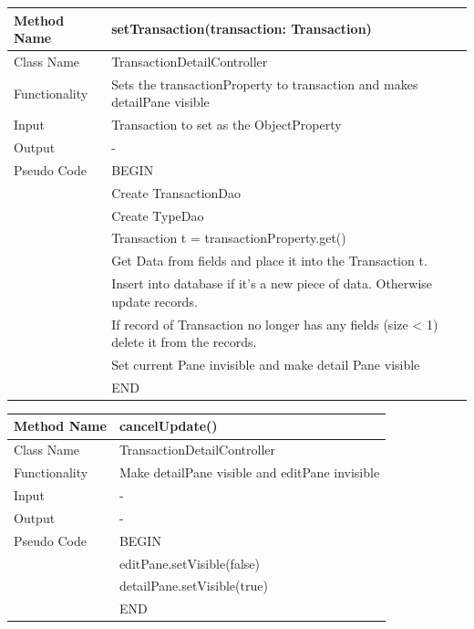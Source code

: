 \documentclass[12pt]{article}
\begin{document}
\begin{tabular}{ |p{3cm}||p{\colWidth}|  }
	\hline
	Method Name &  setTransaction(transaction: Transaction) \\
	\hline
	Class Name & TransactionDetailController\\
	\hline
	Functionality & Sets the transactionProperty to transaction and makes detailPane visible\\
	\hline
	Input & Transaction to set as the ObjectProperty\\
	\hline
	Output & -\\
	\hline
	Pseudo Code 
	& BEGIN\\
	& 		Create TransactionDao \\
	& 		Create TypeDao\\
	&		Transaction t = transactionProperty.get() \\
	& 		Get Data from fields and place it into the Transaction t. \\
	& 		Insert into database if it's a new piece of data. Otherwise update records. \\
	& 		If record of Transaction no longer has any fields (size < 1) delete it from the records. \\
	& 		Set current Pane invisible and make detail Pane visible \\
	& END\\
	\hline
\end{tabular}  

\begin{tabular}{ |p{3cm}||p{\colWidth}|  }
	\hline
	Method Name &  cancelUpdate() \\
	\hline
	Class Name & TransactionDetailController\\
	\hline
	Functionality & Make detailPane visible and editPane invisible\\
	\hline
	Input & -\\
	\hline
	Output & -\\
	\hline
	Pseudo Code & BEGIN\\
	& 	editPane.setVisible(false) \\
	& 	detailPane.setVisible(true)\\
	& END\\
	\hline
\end{tabular}  
\end{document}
